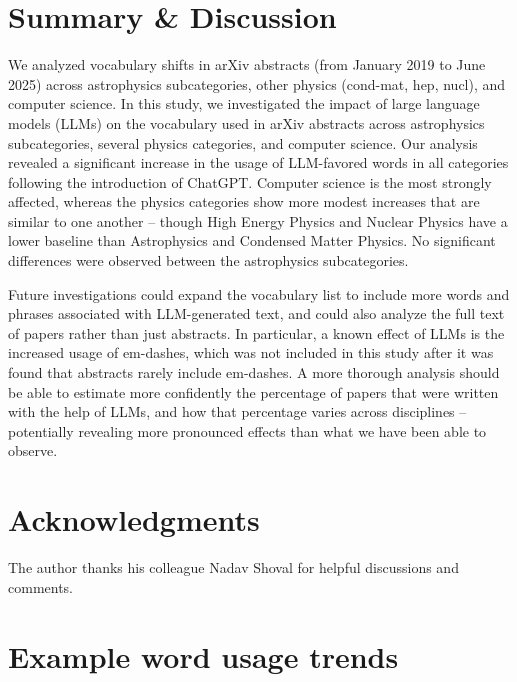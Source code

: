 \documentclass[twocolumn]{aastex701}
\begin{document}
\section{Summary \& Discussion}

We analyzed vocabulary shifts in arXiv abstracts (from January 2019 to June 2025) across astrophysics subcategories, other physics (cond-mat, hep, nucl), and computer science.
In this study, we investigated the impact of large language models (LLMs) on the vocabulary used in arXiv abstracts across astrophysics subcategories, several physics categories, and computer science.
Our analysis revealed a significant increase in the usage of LLM-favored words in all categories following the introduction of ChatGPT.
Computer science is the most strongly affected, whereas the physics categories show more modest increases that are similar to one another -- though High Energy Physics and Nuclear Physics have a lower baseline than Astrophysics and Condensed Matter Physics.
No significant differences were observed between the astrophysics subcategories.

Future investigations could expand the vocabulary list to include more words and phrases associated with LLM-generated text, and could also analyze the full text of papers rather than just abstracts.
In particular, a known effect of LLMs is the increased usage of em-dashes, which was not included in this study after it was found that abstracts rarely include em-dashes.
A more thorough analysis should be able to estimate more confidently the percentage of papers that were written with the help of LLMs, and how that percentage varies across disciplines -- potentially revealing more pronounced effects than what we have been able to observe.


\section*{Acknowledgments}
The author thanks his colleague Nadav Shoval for helpful discussions and comments.

{}


\appendix 
\renewcommand{\thesection}{\Alph{section}}
\renewcommand{\thefigure}{\Alph{section}\arabic{figure}}
\renewcommand{\thetable}{\Alph{section}\arabic{table}}

\section{Example word usage trends}
\setcounter{figure}{0}
\setcounter{table}{0}
\end{document}
